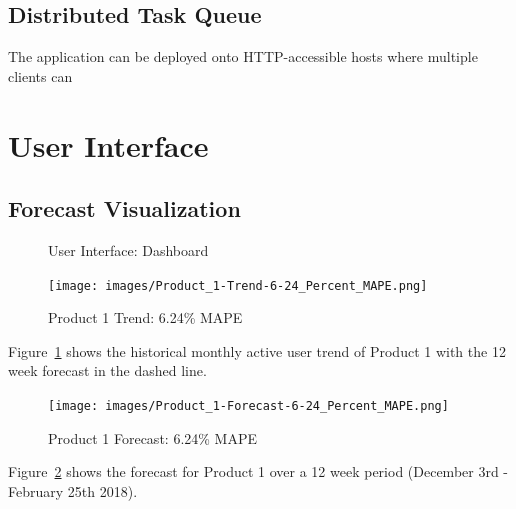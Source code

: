 \documentclass[11pt, oneside]{article}
\begin{document}
\subsection{Distributed Task Queue}
The application can be deployed onto HTTP-accessible hosts where multiple clients can
\section{User Interface}
\subsection{Forecast Visualization}
\begin{figure}[h]
  \caption{User Interface: Dashboard}
  \centering
\end{figure}

\begin{figure}[h]
  \caption{Product 1 Trend: 6.24\% MAPE}
  \centering
  \texttt{[image: images/Product\_1-Trend-6-24\_Percent\_MAPE.png]}
  \label{fig:Product_1-Trend}
\end{figure}

Figure~\ref{fig:Product_1-Trend} shows the historical monthly active user trend of Product 1 with the 12 week forecast in the dashed line.

\begin{figure}[h]
  \caption{Product 1 Forecast: 6.24\% MAPE}
  \centering
  \texttt{[image: images/Product\_1-Forecast-6-24\_Percent\_MAPE.png]}
  \label{fig:Product_1-Forecast}
\end{figure}

Figure~\ref{fig:Product_1-Forecast} shows the forecast for Product 1 over a 12 week period (December 3rd - February 25th 2018).
\end{document}

